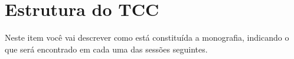 \section{Estrutura do TCC}
Neste item você vai descrever como está constituída a monografia, indicando o
que será encontrado em cada uma das sessões seguintes.



